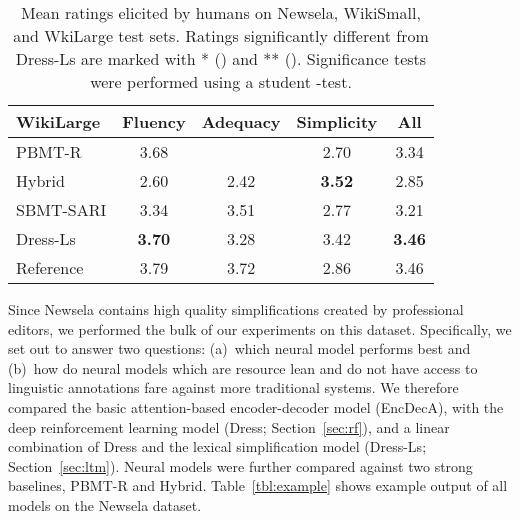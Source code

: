 \documentclass[11pt,letterpaper]{article}
\begin{document}
\begin{table}[t]
\begin{tabular}{|@{~} l@{~} |@{~} c@{~} c@{~}  c@{~}  c@{~} |}
		WikiLarge & Fluency & Adequacy & Simplicity & All \\\hline \hline
		PBMT-R & 3.68 & \hspace{1ex}{\bf 3.63} & \hspace{2ex}2.70 & \hspace{1ex}3.34 \\
		Hybrid & \hspace{2ex}2.60 & \hspace{2ex}2.42 & {\bf 3.52} & \hspace{2ex}2.85 \\
		SBMT-SARI & \hspace{2ex}3.34 & \hspace{1ex}3.51 & \hspace{2ex}2.77 & \hspace{2ex}3.21 \\
		{\sc Dress-Ls} & {\bf 3.70} & 3.28 & {3.42} & {\bf 3.46}
		\\
		Reference & 3.79 & \hspace{2ex}3.72 & \hspace{2ex}2.86 & 3.46 \\
		\hline
	\end{tabular}
\caption{Mean ratings elicited by humans on Newsela, WikiSmall,
		and WkiLarge test sets. Ratings
		significantly different from {\sc Dress-Ls} are marked
		with * (\mbox{}) and ** (\mbox{}). Significance tests were performed using a student
		\mbox{-test}.} 
	\label{tbl:human-newsela}
\end{table}


Since Newsela contains high quality simplifications created by
professional editors, we performed the bulk of our experiments on this
dataset. Specifically, we set out to answer two questions: (a)~which
neural model performs best and (b)~how do neural models which are
resource lean and do not have access to linguistic annotations fare
against more traditional systems. We therefore compared the basic
attention-based encoder-decoder model (EncDecA), with the deep
reinforcement learning model ({\sc Dress}; Section~\ref{sec:rf}), and a
linear combination of {\sc Dress} and the lexical simplification model
({\sc Dress-Ls}; Section~\ref{sec:ltm}).  Neural models were further
compared against two strong baselines, PBMT-R and Hybrid.
Table~\ref{tbl:example} shows example output of all models on the
Newsela dataset.
\end{document}
